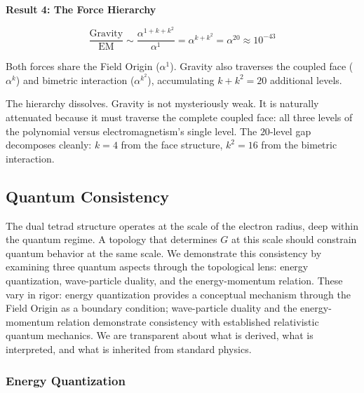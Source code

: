 \documentclass[aps,prd,preprint,superscriptaddress,showpacs,preprintnumbers,amsmath,amssymb,nofootinbib]{revtex4-2}
\begin{document}
\vspace{1.5em}
\noindent
\colorbox{resultgreen}{\parbox{\dimexpr\textwidth-2\fboxsep\relax}{%
\vspace{0.8em}
\centering
\textbf{\large Result 4: The Force Hierarchy}

\vspace{0.5em}
\boldmath
\begin{equation}
\frac{\text{Gravity}}{\text{EM}} \sim \frac{\alpha^{1+k+k^2}}{\alpha^{1}} = \alpha^{k+k^2} = \alpha^{20} \approx 10^{-43}
\label{eq:force-hierarchy}
\end{equation}
\unboldmath

\vspace{0.3em}
Both forces share the Field Origin ($\alpha^1$). Gravity also traverses the coupled face ($\alpha^k$) and bimetric interaction ($\alpha^{k^2}$), accumulating $k + k^2 = 20$ additional levels.
\vspace{0.5em}
}}
\vspace{1cm}

The hierarchy dissolves. Gravity is not mysteriously weak. It is naturally attenuated because it must traverse the complete coupled face: all three levels of the polynomial versus electromagnetism's single level. The $20$-level gap decomposes cleanly: $k = 4$ from the face structure, $k^2 = 16$ from the bimetric interaction.

\subsection{Quantum Consistency}
\label{subsec:quantum}

The dual tetrad structure operates at the scale of the electron radius, deep within the quantum regime. A topology that determines $G$ at this scale should constrain quantum behavior at the same scale. We demonstrate this consistency by examining three quantum aspects through the topological lens: energy quantization, wave-particle duality, and the energy-momentum relation. These vary in rigor: energy quantization provides a conceptual mechanism through the Field Origin as a boundary condition; wave-particle duality and the energy-momentum relation demonstrate consistency with established relativistic quantum mechanics. We are transparent about what is derived, what is interpreted, and what is inherited from standard physics.

\subsubsection*{Energy Quantization}
\end{document}

